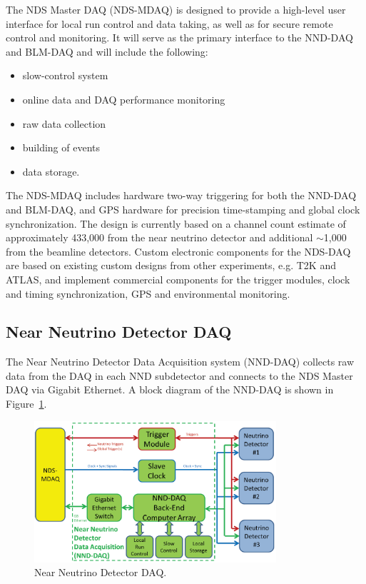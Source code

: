 The NDS Master DAQ (NDS-MDAQ) is designed to provide a high-level user
interface for local run control and data taking, as well as for secure
remote control and monitoring.  It will serve as the primary interface
to the NND-DAQ and BLM-DAQ and will include the following:
\begin{itemize}
\item slow-control system 
\item online data and DAQ performance monitoring  
\item raw data collection
\item building of events
\item data storage.   
\end{itemize}
The NDS-MDAQ includes hardware two-way triggering for both the NND-DAQ
and BLM-DAQ, and GPS hardware for precision time-stamping and global
clock synchronization.  The design is currently based on a channel
count estimate of approximately 433,000 from the near neutrino
detector and additional $\sim$1,000 from the beamline detectors.  Custom
electronic components for the NDS-DAQ are based on existing custom
designs from other experiments, e.g. T2K and ATLAS, and implement
commercial components for the trigger modules, clock and timing
synchronization, GPS and environmental monitoring.

\subsection{Near Neutrino Detector DAQ} 
\label{cdrsec:nd:nnd:daq}


The Near Neutrino Detector Data Acquisition system (NND-DAQ) collects
raw data from the DAQ in each NND subdetector and connects to the NDS
Master DAQ via Gigabit Ethernet. A block diagram of the NND-DAQ is
shown in Figure~\ref{fig:nds-daq-block}. 

\begin{figure}[h!]
\centering
\includegraphics[width=0.8\textwidth]{daq-nnd-block-diagram.png}
\caption{Near Neutrino Detector DAQ.}
\label{fig:nds-daq-block}
\end{figure}

